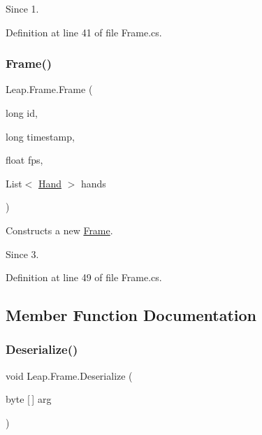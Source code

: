 \begin{DoxySince}{Since}
1. 
\end{DoxySince}


Definition at line 41 of file Frame.\+cs.

\mbox{\label{class_leap_1_1_frame_a88104b28255726f1afffe2c954553e0d}} 
\subsubsection{\texorpdfstring{Frame()}{Frame()}\hspace{0.1cm}{\footnotesize\ttfamily [2/2]}}
{\footnotesize\ttfamily Leap.\+Frame.\+Frame (\begin{DoxyParamCaption}\item[{long}]{id,  }\item[{long}]{timestamp,  }\item[{float}]{fps,  }\item[{List$<$ \mbox{\hyperlink{class_leap_1_1_hand}{Hand}} $>$}]{hands }\end{DoxyParamCaption})}



Constructs a new \mbox{\hyperlink{class_leap_1_1_frame}{Frame}}. 

\begin{DoxySince}{Since}
3. 
\end{DoxySince}


Definition at line 49 of file Frame.\+cs.



\subsection{Member Function Documentation}
\mbox{\label{class_leap_1_1_frame_ad98511374fd0fbb8edfc33ba6c3bb75e}} 
\subsubsection{\texorpdfstring{Deserialize()}{Deserialize()}}
{\footnotesize\ttfamily void Leap.\+Frame.\+Deserialize (\begin{DoxyParamCaption}\item[{byte \mbox{[}$\,$\mbox{]}}]{arg }\end{DoxyParamCaption})}




